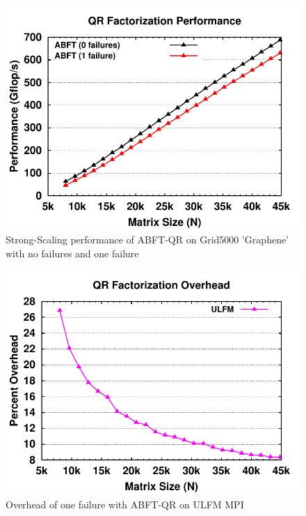 \begin{figure}[t]
    \centering
    \includegraphics[width=\linewidth]{figures/g5k_results_flops}
    \caption{Strong-Scaling performance of ABFT-QR on Grid5000 'Graphene' with no failures and one failure}
    \label{fig:ulfm:qr-failure}
\end{figure}

\begin{figure}[t]
    \centering
    \includegraphics[width=\linewidth]{figures/g5k_results_proportional}
    \caption{Overhead of one failure with ABFT-QR on ULFM MPI}
    \label{fig:ulfm:failure-overhead}
\end{figure}

